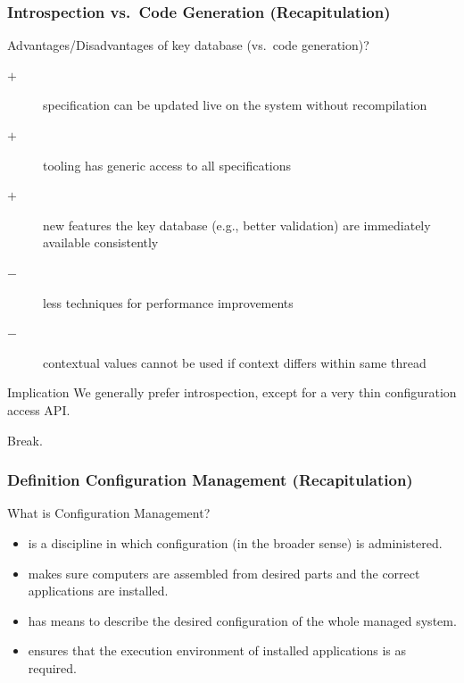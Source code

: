 \begin{frame}
	\frametitle{Introspection vs.\ Code Generation (Recapitulation)}

	\begin{task}
	Advantages/Disadvantages of key database (vs.\ code generation)?
	\end{task}

	\pause

	\begin{description}
	\item[$+$] specification can be updated live on the system without recompilation
	\item[$+$] tooling has generic access to all specifications
 	\item[$+$] new features the key database (e.g., better validation) are immediately available consistently
	\item[$-$] less techniques for performance improvements
	\item[$-$] contextual values cannot be used if context differs within same thread
	\end{description}

	\begin{alertblock}{Implication}
	We generally prefer introspection, except for a very thin configuration access API.
	\end{alertblock}
\end{frame}

\begin{assignment}
	\begin{task}
	Break.
	\end{task}
\end{assignment}


\begin{frame}
	\frametitle{Definition Configuration Management (Recapitulation)}

	\begin{task}
	What is Configuration Management?
	\end{task}

	\pause

	\begin{itemize}
	\item is a discipline in which configuration (in the broader sense) is administered.
	\item makes sure computers are assembled from desired parts and the correct applications are installed.
	\item has means to describe the desired configuration of the whole managed system.
	\item ensures that the execution environment of installed applications is as required.
	\end{itemize}
\end{frame}

